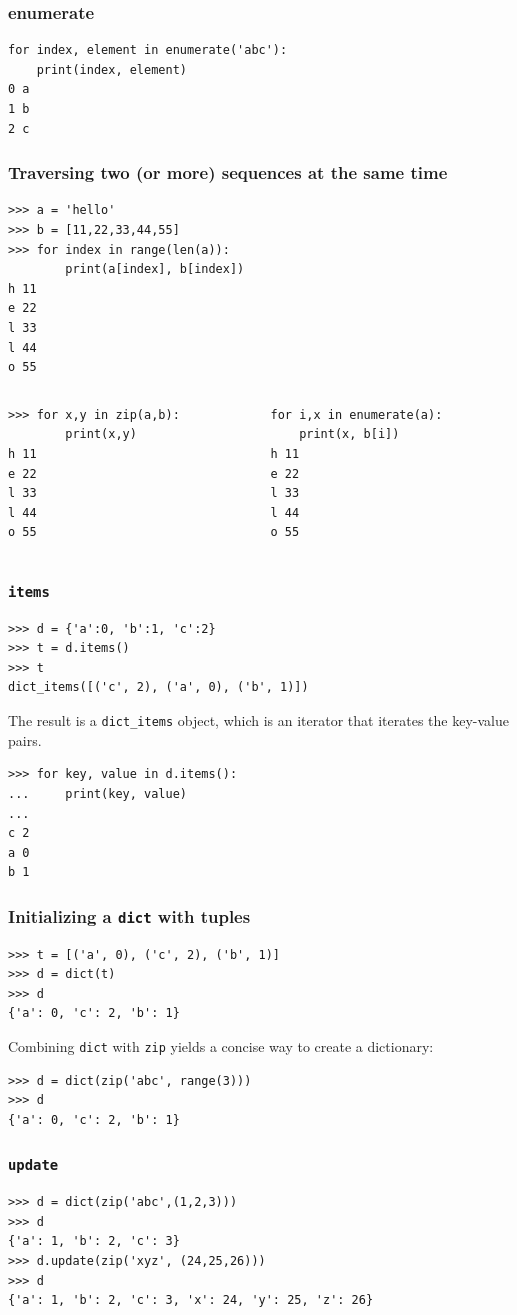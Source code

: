 \documentclass{beamer}
\newcommand{\bfr}[1]{\begin{frame}[fragile]\frametitle{{ #1 }}}
\newcommand{\cola}{\begin{columns}\begin{column}{0.5\textwidth}}
\newcommand{\colb}{\end{column}\begin{column}{0.5\textwidth}}
\newcommand{\colc}{\end{column}\end{columns}}
\begin{document}
\bfr{enumerate}
\begin{lstlisting}
for index, element in enumerate('abc'):
    print(index, element)
0 a
1 b
2 c
\end{lstlisting}
\end{frame}

\bfr{Traversing two (or more) sequences at the same time}
\begin{lstlisting}
>>> a = 'hello'
>>> b = [11,22,33,44,55]
>>> for index in range(len(a)):
        print(a[index], b[index])
h 11
e 22
l 33
l 44
o 55
\end{lstlisting}
\cola
\begin{lstlisting}
>>> for x,y in zip(a,b):
        print(x,y)
h 11
e 22
l 33
l 44
o 55
\end{lstlisting}
\colb
\begin{lstlisting}
for i,x in enumerate(a):
    print(x, b[i])
h 11
e 22
l 33
l 44
o 55
\end{lstlisting}
\colc
\end{frame}

\bfr{\tt items}
\begin{lstlisting}
>>> d = {'a':0, 'b':1, 'c':2}
>>> t = d.items()
>>> t
dict_items([('c', 2), ('a', 0), ('b', 1)])
\end{lstlisting}
The result is a \lstinline{dict_items}
 object, which is an iterator that iterates the key-value pairs.
\begin{lstlisting}
>>> for key, value in d.items():
...     print(key, value)
...
c 2
a 0
b 1
\end{lstlisting}
\end{frame}

\bfr{Initializing a {\tt dict} with tuples}
\begin{lstlisting}
>>> t = [('a', 0), ('c', 2), ('b', 1)]
>>> d = dict(t)
>>> d
{'a': 0, 'c': 2, 'b': 1}
\end{lstlisting}
Combining \lstinline{dict} with \lstinline{zip} yields a concise way to create a dictionary:


\begin{lstlisting}
>>> d = dict(zip('abc', range(3)))
>>> d
{'a': 0, 'c': 2, 'b': 1}
\end{lstlisting}
\end{frame}



\bfr{\tt update}
\begin{lstlisting}
>>> d = dict(zip('abc',(1,2,3)))
>>> d
{'a': 1, 'b': 2, 'c': 3}
>>> d.update(zip('xyz', (24,25,26)))
>>> d
{'a': 1, 'b': 2, 'c': 3, 'x': 24, 'y': 25, 'z': 26}
\end{lstlisting}
\end{frame}
\end{document}
